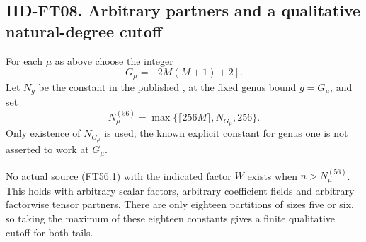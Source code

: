 \subsection*{HD-FT08. Arbitrary partners and a qualitative natural-degree cutoff}

For each \(\mu\) as above choose the integer
\[
 G_\mu=\left\lceil2M(M+1)+2\right\rceil.
 \tag{FT56.11}
\]
Let \(N_g\) be the constant in the published
\cite[Theorem~1.2]{HD:MondererNeftin2022}, at the fixed genus bound
\(g=G_\mu\), and set
\[
 N_\mu^{(56)}
   =\max\{\lceil256M\rceil,N_{G_\mu},256\}.
 \tag{FT56.12}
\]
Only existence of \(N_{G_\mu}\) is used; the known explicit constant
for genus one is not asserted to work at \(G_\mu\).

\begin{theorem}[HD-FT08]
No actual source (FT56.1) with the indicated factor \(W\) exists when
\(n>N_\mu^{(56)}\).  This holds with arbitrary scalar factors,
arbitrary coefficient fields and arbitrary factorwise tensor partners.
There are only eighteen partitions of sizes five or six, so taking
the maximum of these eighteen constants gives a finite qualitative
cutoff for both tails.
\end{theorem}

